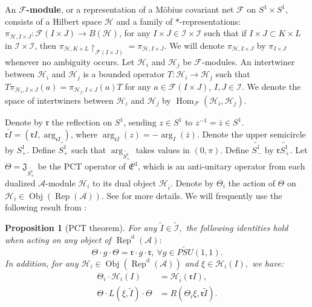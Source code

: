 \documentclass{article}
\newtheorem{proposition}{Proposition}
\newcommand{\hilb}{\mathcal{H}}
\newcommand{\A}{\mathcal{A}}
\begin{document}
An \textbf{$\mathcal{F}$-module}, or a representation of a 
M\"{o}bius covariant net   $\mathcal{F}$ on $S^1 \times S^1$, 
consists of a Hilbert space $\hilb$ and a family of $*$-representations:
$\pi_{\hilb,I\times J}: \mathcal{F}(I\times J) \to B(\hilb)$, for any $I\times J \in \mathcal{I \times I}$
such that if 
$I\times J \subset K\times L $ in $\mathcal{I\times I}$,
then  $\pi_{\hilb,K\times L}\restriction_{ \mathcal{F}(I\times J)} =  \pi_{\hilb,I\times J}$. We will denote 
$\pi_{\hilb,I\times J}$  by  $\pi_{I\times J}$ whenever
no ambiguity occurs.  Let $\hilb_i$ and $\hilb_j$ be 
$\mathcal{F}$-modules. An intertwiner between $\hilb_i$ and $\hilb_j$ is a bounded operator $T: \hilb_i \to \hilb_j$ such that 
$T\pi_{\hilb_i, I \times J}(a) = \pi_{\hilb_j, I \times J}(a)T$ for any
$a \in \mathcal{F}(I \times J)$, $I,J \in \mathcal{I}$.   We denote the space of intertwiners between $\hilb_i$ and $\hilb_j$ by
$\operatorname{Hom}_{\mathcal{F}}(\hilb_i, \hilb_j)$. 


 Denote by $\mathfrak{r}$ the reflection on $S^1$, sending 
 $z \in S^1 $ to $z^{-1} = \overline{z} \in S^1$. 
$\mathfrak{r}\widetilde{I} = ( \mathfrak{r} I, \arg_{\mathfrak{r}I})$, where $\arg_{\mathfrak{r}I}(z) = -\arg_I(\overline{z})$. 
Denote the upper semicircle by $S^1_+$. Define $\widetilde{S^1_+}$ such that $\arg_{\widetilde{S^1_+}}$ takes values in $(0,\pi)$. Define $\widetilde{S^1_-}$ by $\mathfrak{r}\widetilde{S^1_+}$. 
 Let $\Theta = \mathfrak{J}_{\widetilde{S^1_+}}$ be the PCT operator of $\mathfrak{E}^{\operatorname{d}}$, which is an 
 anti-unitary operator from each dualized $\A$-module $\hilb_i$ to its dual object $\hilb_{\overline{i}}$. 
 Denote by $\Theta_i$ the action of $\Theta$ on $\hilb_i \in \operatorname{Obj}(\operatorname{Rep}(\A))$. 
 See \cite[Section 6]{gui2021bisognano} for more details.
 We will frequently use the following result from \cite[Theorem 6.4]{gui2021bisognano}:
 \begin{proposition}[PCT theorem]
     For any $\widetilde{I}\in\widetilde{\mathcal{I}}, $ the following identities hold when acting on any object of $\operatorname{Rep}^{\operatorname{d}}(\A):$
     \[
     \Theta \cdot g \cdot \Theta  = \mathfrak{r}\cdot g \cdot \mathfrak{r}, \ \forall g\in \widetilde{PSU}(1,1). 
     \]
     In addition, for any $\hilb_i \in \operatorname{Obj}\left(\operatorname{Rep}^{\operatorname{d}}(\A)\right)$ and $\xi \in \hilb_i(I), $
     we have: 
     \begin{align*}
         \Theta_i \cdot \hilb_i(I) &=  \hilb_{\overline{i}}(\mathfrak{r}I), \\
         \Theta \cdot L(\xi, \widetilde{I}) \cdot \Theta &=  R(\Theta_i\xi, \mathfrak{r}\widetilde{I}). 
     \end{align*}
 \end{proposition}
\end{document}
